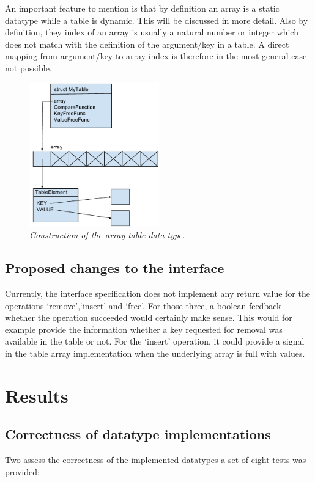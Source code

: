 \documentclass[a4paper,11pt,twoside]{article}
\begin{document}
An important feature to mention is that by definition an array is a 
static datatype while a table is dynamic. This will be discussed in 
more detail. Also by definition, they index of an array is usually a 
natural number or integer which does not match with the definition of 
the argument/key in a table. A direct mapping from argument/key to 
array index is therefore in the most general case not possible. 


\begin{figure}[H]
\centering
\includegraphics[width=0.5\textwidth]{figures/arraytable.pdf}
\caption{\textit{Construction of the array table data type.}}
\label{fig:arraytable}
\end{figure}

\subsection{Proposed changes to the interface}
Currently, the interface specification does not implement any 
return value for the operations `remove',`insert' and `free'. For
those three, a boolean feedback whether the operation succeeded would
certainly make sense. This would for example provide the information
whether a key requested for removal was available in the table or
not. For the `insert' operation, it could provide a signal in the
table array implementation when the underlying array is full with
values. 


\section{Results}
\subsection{Correctness of datatype implementations}
Two assess the correctness of the implemented datatypes a set of eight
tests was provided:
\end{document}

